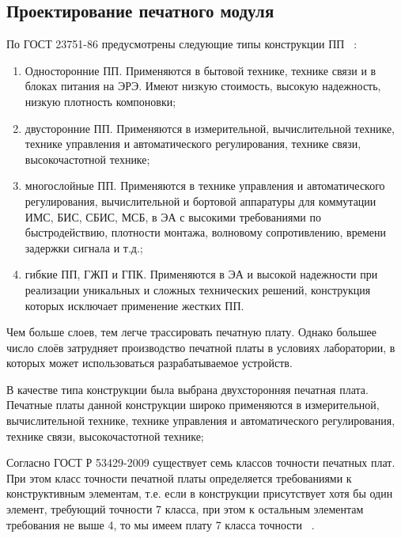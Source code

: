  

\subsection{Проектирование печатного модуля}
По ГОСТ 23751-86 предусмотрены следующие типы конструкции ПП
~\cite{PirogovaEngineering}:
\begin{enumerate}

\item Односторонние ПП. Применяются в бытовой технике, технике связи
  и в блоках питания на ЭРЭ. Имеют низкую стоимость,
  высокую надежность, низкую плотность компоновки;

\item двусторонние ПП. Применяются в измерительной, вычислительной
  технике, технике управления и автоматического регулирования,
  технике связи, высокочастотной технике;

\item многослойные ПП. Применяются в технике управления и
  автоматического регулирования,
  вычислительной и бортовой аппаратуры для
  коммутации ИМС, БИС, СБИС, МСБ, в ЭА с высокими требованиями по быстродействию,
  плотности монтажа,  волновому сопротивлению, времени задержки сигнала и т.д.;

\item гибкие ПП, ГЖП и ГПК. Применяются в ЭА и высокой надежности
  при реализации уникальных и сложных технических решений,
  конструкция которых исключает применение жестких ПП.
\end{enumerate}

Чем больше слоев, тем легче трассировать печатную плату.
Однако большее число слоёв затрудняет производство печатной платы
в условиях лаборатории, в которых может использоваться разрабатываемое
устройств.


В качестве типа конструкции была выбрана двухсторонняя печатная плата.
Печатные платы данной конструкции широко применяются в измерительной,
вычислительной технике, технике управления и автоматического регулирования,
технике связи, высокочастотной технике;

 Согласно ГОСТ Р 53429-2009 существует семь классов точности печатных
плат. При этом класс точности печатной платы определяется требованиями
к конструктивным элементам, т.е. если в конструкции присутствует хотя
бы один элемент, требующий точности 7 класса, при этом к остальным
элементам требования не выше 4, то мы имеем плату 7 класса точности
~\cite{rezonit-class}.

